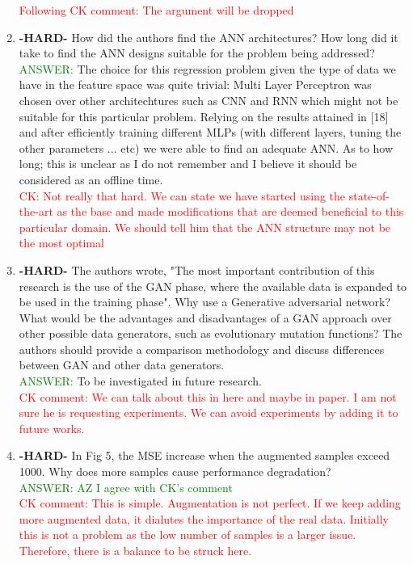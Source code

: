 \documentclass{article}
\begin{document}
\begin{enumerate}
\textcolor{red}{Following CK comment: The argument will be dropped}

\item \textbf{-HARD-} How did the authors find the ANN architectures? How long did it take to find the ANN designs suitable for the problem being addressed? \\
\textcolor{green}{ANSWER: } The choice for this regression problem given the type of data we have in the feature space was quite trivial: Multi Layer Perceptron was chosen over other architechtures such as CNN and RNN which might not be suitable for this particular problem. Relying on the results attained in [18] and after efficiently training different MLPs (with different layers, tuning the other parameters ... etc) we were able to find an adequate ANN. As to how long; this is unclear as I do not remember and I believe it should be considered as an offline time.\\   

\textcolor{red}{CK: Not really that hard. We can state we have started using the state-of-the-art as the base and made modifications that are deemed beneficial to this particular domain. We should tell him that the ANN structure may not be the most optimal}

\item \textbf{-HARD-} The authors wrote, "The most important contribution of this research is the use of
the GAN phase, where the available data is expanded to be
used in the training phase". Why use a Generative adversarial network? What would be the advantages and disadvantages of a GAN approach over other possible data generators, such as evolutionary mutation functions? The authors should provide a comparison methodology and discuss differences between GAN and other data generators. \\
\textcolor{green}{ANSWER: } To be investigated in future research.\\ \textcolor{red}{CK comment: We can talk about this in here and maybe in paper. I am not sure he is requesting experiments. We can avoid experiments by adding it to future works.}


\item \textbf{-HARD-} In Fig 5, the MSE increase when the augmented samples exceed 1000. Why does more samples cause performance degradation? \\ 
\textcolor{green}{ANSWER: AZ I agree with CK's comment}\\ \textcolor{red}{CK comment: This is simple. Augmentation is not perfect. If we keep adding more augmented data, it dialutes the importance of the real data. Initially this is not a problem as the low number of samples is a larger issue. Therefore, there is a balance to be struck here.} 



\end{enumerate}
\end{document}
